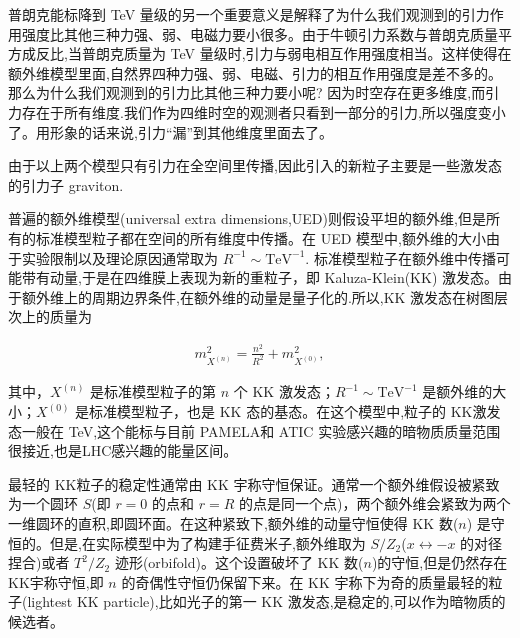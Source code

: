 普朗克能标降到 TeV 量级的另一个重要意义是解释了为什么我们观测到的引力作用强度比其他三种力强、弱、电磁力要小很多。由于牛顿引力系数与普朗克质量平方成反比,当普朗克质量为 TeV 量级时,引力与弱电相互作用强度相当。这样使得在额外维模型里面,自然界四种力强、弱、电磁、引力的相互作用强度是差不多的。那么为什么我们观测到的引力比其他三种力要小呢? 因为时空存在更多维度,而引力存在于所有维度.我们作为四维时空的观测者只看到一部分的引力,所以强度变小了。用形象的话来说,引力“漏”到其他维度里面去了。

由于以上两个模型只有引力在全空间里传播,因此引入的新粒子主要是一些激发态的引力子 graviton.

普遍的额外维模型(universal extra dimensions,UED)则假设平坦的额外维,但是所有的标准模型粒子都在空间的所有维度中传播。在 UED 模型中,额外维的大小由于实验限制以及理论原因通常取为 $R^{-1} \sim \mathrm{TeV}^{-1} .$ 标准模型粒子在额外维中传播可能带有动量,于是在四维膜上表现为新的重粒子，即 Kaluza-Klein(KK) 激发态。由于额外维上的周期边界条件,在额外维的动量是量子化的.所以,KK 激发态在树图层次上的质量为

\begin{align}
m_{X^{(n)}}^2
=\frac{n^2 }{R^2 } + m_{X^{(0)}}^2,
\end{align}

其中，$X^{(n)} $ 是标准模型粒子的第 $n$ 个 KK 激发态；$R^{-1}\sim \mathrm{TeV}^{-1} $ 是额外维的大小；$X^{(0)}$ 是标准模型粒子，也是 KK 态的基态。在这个模型中,粒子的 KK激发态一般在 TeV,这个能标与目前 PAMELA和 ATIC 实验感兴趣的暗物质质量范围很接近,也是LHC感兴趣的能量区间。

最轻的 KK粒子的稳定性通常由 KK 宇称守恒保证。通常一个额外维假设被紧致为一个圆环 $S$(即 $r=0$ 的点和 $r=R$ 的点是同一个点)，两个额外维会紧致为两个一维圆环的直积,即圆环面。在这种紧致下,额外维的动量守恒使得 KK 数($n$) 是守恒的。但是,在实际模型中为了构建手征费米子,额外维取为 $S/Z_2$($x\leftrightarrow -x$ 的对径捏合)或者 $T^2/Z_2$ 迹形(orbifold)。这个设置破坏了 KK 数($n$)的守恒,但是仍然存在 KK宇称守恒,即 $n$ 的奇偶性守恒仍保留下来。在 KK 宇称下为奇的质量最轻的粒子(lightest KK particle),比如光子的第一 KK 激发态,是稳定的,可以作为暗物质的候选者。

\newpage